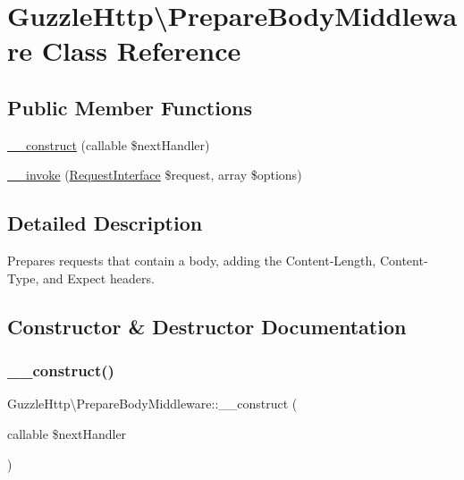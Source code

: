 \hypertarget{classGuzzleHttp_1_1PrepareBodyMiddleware}{}\section{Guzzle\+Http\textbackslash{}Prepare\+Body\+Middleware Class Reference}
\label{classGuzzleHttp_1_1PrepareBodyMiddleware}
\subsection*{Public Member Functions}
\begin{DoxyCompactItemize}
\item 
\hyperlink{classGuzzleHttp_1_1PrepareBodyMiddleware_a1a44f7db9f680e3b57ab1d04ee17e2f9}{\+\_\+\+\_\+construct} (callable \$next\+Handler)
\item 
\hyperlink{classGuzzleHttp_1_1PrepareBodyMiddleware_aef1eac99cf0d19c209e821cb601c2ecf}{\+\_\+\+\_\+invoke} (\hyperlink{interfacePsr_1_1Http_1_1Message_1_1RequestInterface}{Request\+Interface} \$request, array \$options)
\end{DoxyCompactItemize}


\subsection{Detailed Description}
Prepares requests that contain a body, adding the Content-\/\+Length, Content-\/\+Type, and Expect headers. 

\subsection{Constructor \& Destructor Documentation}
\mbox{\label{classGuzzleHttp_1_1PrepareBodyMiddleware_a1a44f7db9f680e3b57ab1d04ee17e2f9}} 
\subsubsection{\texorpdfstring{\+\_\+\+\_\+construct()}{\_\_construct()}}
{\footnotesize\ttfamily Guzzle\+Http\textbackslash{}\+Prepare\+Body\+Middleware\+::\+\_\+\+\_\+construct (\begin{DoxyParamCaption}\item[{callable}]{\$next\+Handler }\end{DoxyParamCaption})}


